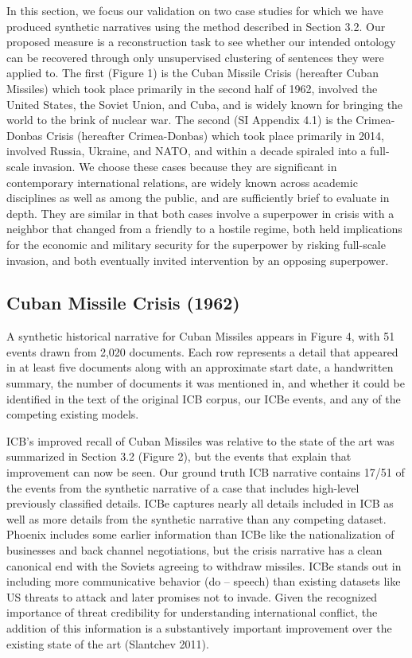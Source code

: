 \documentclass{article}
\begin{document}
In this section, we focus our validation on two case studies for which
we have produced synthetic narratives using the method described in
Section 3.2. Our proposed measure is a reconstruction task to see
whether our intended ontology can be recovered through only unsupervised
clustering of sentences they were applied to. The first (Figure 1) is
the Cuban Missile Crisis (hereafter Cuban Missiles) which took place
primarily in the second half of 1962, involved the United States, the
Soviet Union, and Cuba, and is widely known for bringing the world to
the brink of nuclear war. The second (SI Appendix 4.1) is the
Crimea-Donbas Crisis (hereafter Crimea-Donbas) which took place
primarily in 2014, involved Russia, Ukraine, and NATO, and within a
decade spiraled into a full-scale invasion. We choose these cases
because they are significant in contemporary international relations,
are widely known across academic disciplines as well as among the
public, and are sufficiently brief to evaluate in depth. They are
similar in that both cases involve a superpower in crisis with a
neighbor that changed from a friendly to a hostile regime, both held
implications for the economic and military security for the superpower
by risking full-scale invasion, and both eventually invited intervention
by an opposing superpower.

\hypertarget{cuban-missile-crisis-1962}{%
\subsection{Cuban Missile Crisis
(1962)}\label{cuban-missile-crisis-1962}}

A synthetic historical narrative for Cuban Missiles appears in Figure 4,
with 51 events drawn from 2,020 documents. Each row represents a detail
that appeared in at least five documents along with an approximate start
date, a handwritten summary, the number of documents it was mentioned
in, and whether it could be identified in the text of the original ICB
corpus, our ICBe events, and any of the competing existing models.

ICB's improved recall of Cuban Missiles was relative to the state of the
art was summarized in Section 3.2 (Figure 2), but the events that
explain that improvement can now be seen. Our ground truth ICB narrative
contains 17/51 of the events from the synthetic narrative of a case that
includes high-level previously classified details. ICBe captures nearly
all details included in ICB as well as more details from the synthetic
narrative than any competing dataset. Phoenix includes some earlier
information than ICBe like the nationalization of businesses and back
channel negotiations, but the crisis narrative has a clean canonical end
with the Soviets agreeing to withdraw missiles. ICBe stands out in
including more communicative behavior (do -- speech) than existing
datasets like US threats to attack and later promises not to invade.
Given the recognized importance of threat credibility for understanding
international conflict, the addition of this information is a
substantively important improvement over the existing state of the art
(Slantchev 2011).
\end{document}
